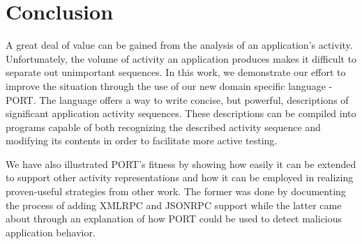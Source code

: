 \section{Conclusion}
\label{sec:Conclusion}
%
%

A great deal of value can be gained from the analysis of an application's
activity.
Unfortunately,
the volume of activity
an application produces
makes it difficult
to separate out
unimportant sequences.
In this work,
we demonstrate our effort
to improve the situation
through the use of
our new domain specific language
- PORT.
The language offers
a way to write concise,
but powerful,
descriptions of
significant application activity sequences.
These descriptions
can be compiled
into programs capable of
both recognizing the described activity
sequence
and modifying its contents in order to
facilitate more active testing.

We have also
illustrated PORT's fitness
by showing
how easily it
can be extended
to support other activity
representations
and how it can be employed
in realizing proven-useful
strategies from other work.
The former was done
by documenting the process
of adding XMLRPC and JSONRPC support
while the latter came about
through an explanation
of how PORT could be used to
detect malicious application behavior.


